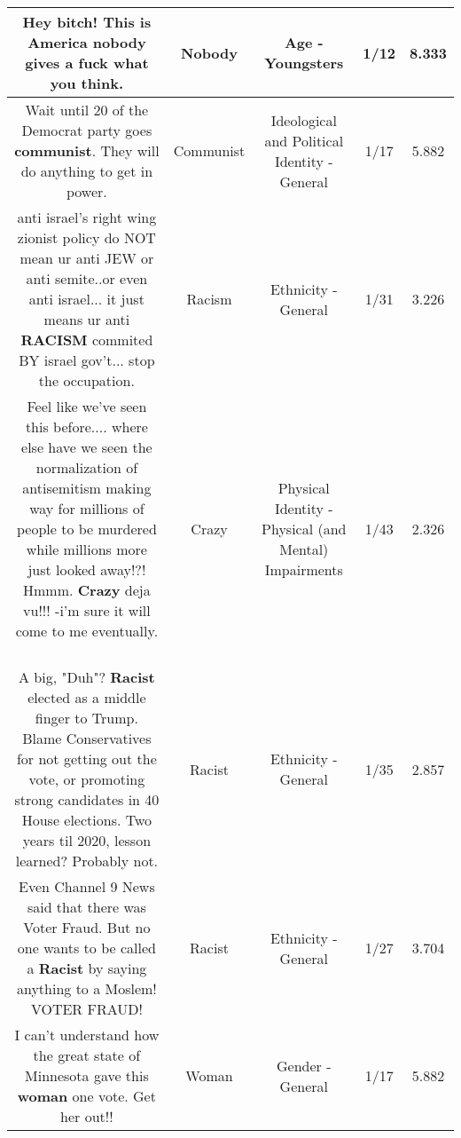 \documentclass[11pt]{article}
\newlength\mylength
\begin{document}
\begin{center}
\begin{longtable}{|C{.65\mylength}|C{.30\mylength}|C{.12\mylength}|C{.12\mylength}|C{.12\mylength}|}
  \small Hey bitch! This is America \textbf{nobody} gives a fuck what you think.\normalsize   & Nobody & Age - Youngsters & 1/12 & 8.333 \\  \hline
  \small Wait until 20 of the Democrat party goes \textbf{communist}. They will do anything to get in power.\normalsize   & Communist &  Ideological and Political Identity - General & 1/17 & 5.882 \\  \hline
  \small anti israel's right wing zionist policy do NOT mean ur anti JEW or anti semite..or even anti israel... it just means ur anti \textbf{RACISM} commited BY israel gov't... stop the occupation.\normalsize   & Racism & Ethnicity - General & 1/31 & 3.226 \\  \hline
  \small Feel like we've seen this before.... where else have we seen the normalization of antisemitism making way for millions of people to be murdered while millions more just looked away!?! Hmmm. \textbf{Crazy} deja vu!!! -i'm sure it will come to me eventually.  🤨\normalsize   & Crazy & Physical Identity - Physical (and Mental) Impairments & 1/43 & 2.326 \\  \hline
  \small A big, "Duh"? \textbf{Racist} elected as a middle finger to Trump. Blame Conservatives for not getting out the vote, or promoting strong candidates in 40 House elections. Two years til 2020, lesson learned? Probably not.\normalsize   & Racist & Ethnicity - General & 1/35 & 2.857 \\  \hline
  \small Even Channel 9 News said that there was Voter Fraud. But no one wants to be called a \textbf{Racist} by saying anything to a Moslem! VOTER FRAUD!\normalsize   & Racist & Ethnicity - General & 1/27 & 3.704 \\  \hline
  \small I can't understand how the great state of Minnesota gave this \textbf{woman} one vote. Get her out!!\normalsize   & Woman & Gender - General & 1/17 & 5.882 \\  \hline

\end{longtable}
\end{center}
\end{document}
